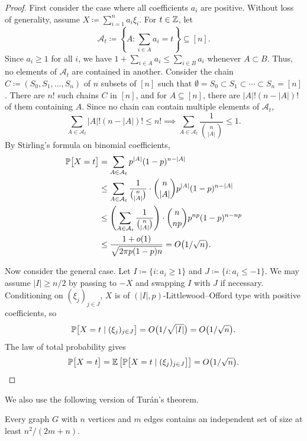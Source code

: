 \begin{proof}
  First consider the case where all coefficients $a_i$ are positive. Without loss of generality, assume $X \coloneqq \sum_{i = 1}^n a_i \xi_i$. For $t \in \mathbb{Z}$, let
  \[
    \mathcal{A}_t \coloneqq \left\{A : \sum_{i \in A} a_i = t\right\} \subseteq [n].
  \]
  Since $a_i \geq 1$ for all $i$, we have $1 + \sum_{i \in A} a_i \leq \sum_{i \in B} a_i$ whenever $A \subset B$. Thus, no elements of $\mathcal{A}_t$ are contained in another. Consider the chain $C \coloneqq (S_0, S_1, \ldots, S_n)$ of $n$ subsets of $[n]$ such that $\emptyset = S_0 \subset S_1 \subset \cdots \subset S_n = [n]$. There are $n!$ such chains $C$ in $[n]$, and for $A \subseteq [n]$, there are $|A|!(n - |A|)!$ of them containing $A$. Since no chain can contain multiple elements of $\mathcal{A}_t$,
  \[
    \sum_{A \in \mathcal{A}_t} |A|!(n - |A|)! \leq n! \implies \sum_{A \in \mathcal{A}_t} \frac{1}{\binom{n}{|A|}} \leq 1.
  \] 
  By Stirling's formula on binomial coefficients,
  \begin{align*}
    \mathbb{P}\bigl[X = t\bigr] 
    &= \sum_{A \in \mathcal{A}_t} p^{|A|}(1 - p)^{n - |A|} \\
    &\leq \sum_{A \in \mathcal{A}_t} \frac{1}{\binom{n}{|A|}} \cdot \binom{n}{|A|}p^{|A|}(1 - p)^{n - |A|} \\
    &\leq \left(\sum_{A \in \mathcal{A}_t} \frac{1}{\binom{n}{|A|}}\right) \cdot \binom{n}{np}p^{np}(1 - p)^{n - np} \\
    &\leq \frac{1 + o(1)}{\sqrt{2\pi p(1 - p)n}} = O\bigl(1/\sqrt{n}\bigr).
  \end{align*}

  Now consider the general case. Let $I \coloneqq \{i : a_i \geq 1\}$ and $J \coloneqq \{i : a_i \leq -1\}$. We may assume $|I| \geq n/2$ by passing to $-X$ and swapping $I$ with $J$ if necessary. Conditioning on $(\xi_j)_{j \in J}$, $X$ is of $(|I|, p)$-Littlewood--Offord type with positive coefficients, so
  \[
    \mathbb{P}\bigl[X = t \mid (\xi_j)_{j \in J}\bigr] = O\bigl(1/\sqrt{|I|}\bigr) = O\bigl(1/\sqrt{n}\bigr).
  \]
  The law of total probability gives
  \[
    \mathbb{P}\bigl[X = t\bigr] = \mathbb{E}\left[\mathbb{P}\bigl[X = t \mid (\xi_j)_{j \in J}\bigr]\right] = O\bigl(1/\sqrt{n}\bigr).
  \]
\end{proof}

We also use the following version of Tur\'{a}n's theorem.

\begin{proposition}
  \label{prop:turan}
  
  Every graph $G$ with $n$ vertices and $m$ edges contains an independent set of size at least $n^2/(2m + n)$.
\end{proposition}

